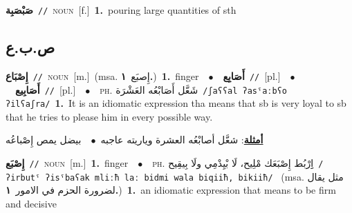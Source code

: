 \documentclass[10pt,a4paper,twoside]{article} %
\begin{document}
\begin{multicols}{2}
{\setlength\topsep{0pt}\textbf{\foreignlanguage{arabic}{صَبْصَبِة}}\ {\color{gray}\texttt{//}\color{black}}\ \textsc{noun}\ [f.]\ \textbf{1.}~pouring large quantities of sth\ } \vspace{2mm}

\vspace{-3mm}
\subsection*{\color{blue}\foreignlanguage{arabic}{ص.ب.ع}\color{blue}{}} 

{\setlength\topsep{0pt}\textbf{\foreignlanguage{arabic}{إِصْبَاع}}\ {\color{gray}\texttt{//}\color{black}}\ \textsc{noun}\ [m.]\ \color{gray}(msa. \foreignlanguage{arabic}{إِصبَع}~\foreignlanguage{arabic}{\textbf{١.}})\color{black}\ \textbf{1.}~finger\ \ $\bullet$\ \ \setlength\topsep{0pt}\textbf{\foreignlanguage{arabic}{أَصَابِع}}\ {\color{gray}\texttt{//}\color{black}}\ [pl.]\ \ $\bullet$\ \ \setlength\topsep{0pt}\textbf{\foreignlanguage{arabic}{أَصَابِيع}}\ {\color{gray}\texttt{//}\color{black}}\ [pl.]\ \ $\bullet$\ \ \textsc{ph.} \color{gray} \foreignlanguage{arabic}{شَعَّل أَصَابْعُه العَشْرَة}\color{black}\ {\color{gray}\texttt{/{\sffamily ʃaʕʕal ʔasˤaːbʕo ʔilʕaʃra}/}\color{black}}\ \textbf{1.}~It is an idiomatic expression tha means that sb is very loyal to sb that he tries to please him in every possible way.\  \begin{flushright}\color{gray}\foreignlanguage{arabic}{\textbf{\underline{\foreignlanguage{arabic}{أمثلة}}}: شعَّل أصابْعُه العشرة وياريته عاجبه\ $\bullet$\ \  بيضل يمص إِصْباعُه}\end{flushright}\color{black}} \vspace{2mm}

{\setlength\topsep{0pt}\textbf{\foreignlanguage{arabic}{إِصْبَع}}\ {\color{gray}\texttt{//}\color{black}}\ \textsc{noun}\ [m.]\ \textbf{1.}~finger\ \ $\bullet$\ \ \textsc{ph.} \color{gray} \foreignlanguage{arabic}{اِِرْبُط إِصْبَعَك مْلِيح، لَا بْيِدْمِي ولَا بِيقِيح}\color{black}\ {\color{gray}\texttt{/{\sffamily ʔirbutˤ ʔisˤbaʕak mliːħ laː bidmi wala biqiiħ, bikiiħ}/}\color{black}}\ \color{gray} (msa. \foreignlanguage{arabic}{مثل يقال لضرورة الحزم في الامور}~\foreignlanguage{arabic}{\textbf{١.}})\color{black}\ \textbf{1.}~an idiomatic expression that means to be firm and decisive\ } \vspace{2mm}


\end{multicols}
\end{document}
